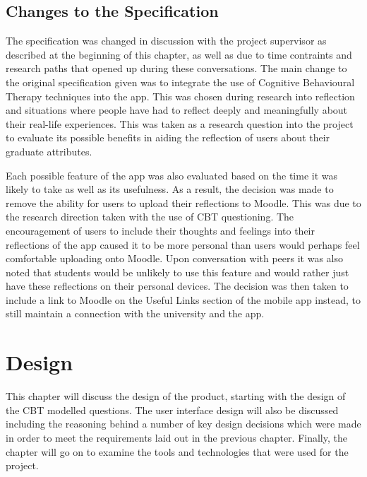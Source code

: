 \documentclass{l4proj}
\begin{document}
\section{Changes to the Specification}

The specification was changed in discussion with the project supervisor as described at the beginning of this chapter, as well as due to time contraints and research paths that opened up during these conversations. The main change to the original specification given was to integrate the use of Cognitive Behavioural Therapy techniques into the app. This was chosen during research into reflection and situations where people have had to reflect deeply and meaningfully about their real-life experiences. This was taken as a research question into the project to evaluate its possible benefits in aiding the reflection of users about their graduate attributes. 

Each possible feature of the app was also evaluated based on the time it was likely to take as well as its usefulness. As a result, the decision was made to remove the ability for users to upload their reflections to Moodle. This was due to the research direction taken with the use of CBT questioning. The encouragement of users to include their thoughts and feelings into their reflections of the app caused it to be more personal than users would perhaps feel 
comfortable uploading onto Moodle. Upon conversation with peers it was also noted that students would be unlikely to use this feature and would rather just have these reflections on their personal devices. The decision was then taken to include a link to Moodle on the Useful Links section of the mobile app instead, to still maintain a connection with the university and the app. 


\chapter{Design}

This chapter will discuss the design of the product, starting with the design of the CBT modelled questions. The user interface design will also be discussed including the reasoning behind a number of key design decisions which were made in order to meet the requirements laid out in the previous chapter. Finally, the chapter will go on to examine the tools and technologies that were used for the project. 
\end{document}
